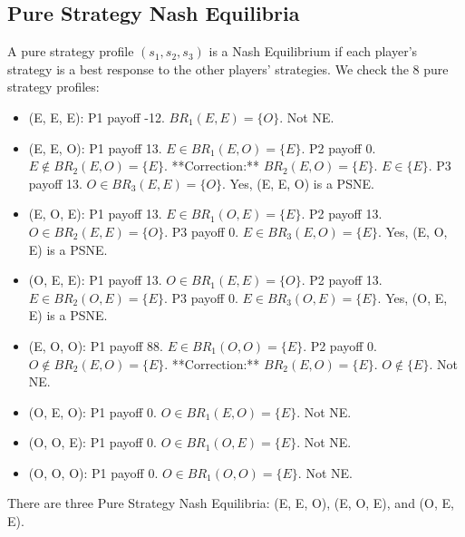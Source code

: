 \documentclass{article}
\begin{document}
\subsection{Pure Strategy Nash Equilibria}
A pure strategy profile $(s_1, s_2, s_3)$ is a Nash Equilibrium if each player's strategy is a best response to the other players' strategies. We check the 8 pure strategy profiles:
\begin{itemize}
    \item (E, E, E): P1 payoff -12. $BR_1(E, E) = \{O\}$. Not NE.
    \item (E, E, O): P1 payoff 13. $E \in BR_1(E, O)=\{E\}$. P2 payoff 0. $E \notin BR_2(E, O)=\{E\}$. **Correction:** $BR_2(E,O) = \{E\}$. $E \in \{E\}$. P3 payoff 13. $O \in BR_3(E, E)=\{O\}$. Yes, (E, E, O) is a PSNE.
    \item (E, O, E): P1 payoff 13. $E \in BR_1(O, E)=\{E\}$. P2 payoff 13. $O \in BR_2(E, E)=\{O\}$. P3 payoff 0. $E \in BR_3(E, O)=\{E\}$. Yes, (E, O, E) is a PSNE.
    \item (O, E, E): P1 payoff 13. $O \in BR_1(E, E)=\{O\}$. P2 payoff 13. $E \in BR_2(O, E)=\{E\}$. P3 payoff 0. $E \in BR_3(O, E)=\{E\}$. Yes, (O, E, E) is a PSNE.
    \item (E, O, O): P1 payoff 88. $E \in BR_1(O, O)=\{E\}$. P2 payoff 0. $O \notin BR_2(E, O)=\{E\}$. **Correction:** $BR_2(E,O) = \{E\}$. $O \notin \{E\}$. Not NE.
    \item (O, E, O): P1 payoff 0. $O \in BR_1(E, O)=\{E\}$. Not NE.
    \item (O, O, E): P1 payoff 0. $O \in BR_1(O, E)=\{E\}$. Not NE.
    \item (O, O, O): P1 payoff 0. $O \in BR_1(O, O)=\{E\}$. Not NE.
\end{itemize}
There are three Pure Strategy Nash Equilibria: (E, E, O), (E, O, E), and (O, E, E).
\end{document}
